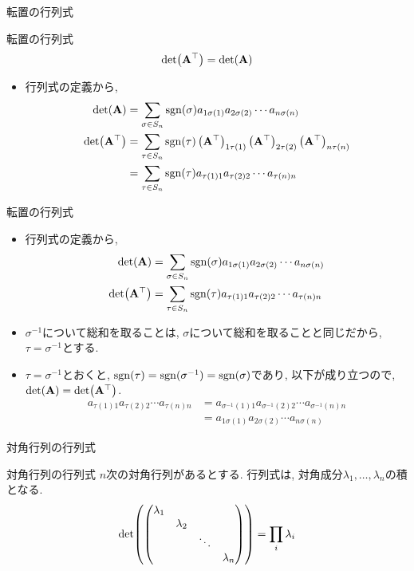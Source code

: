 \documentclass[dvipdfmx,notheorems,t]{beamer}
\begin{document}
\begin{frame}{転置の行列式}
\begin{block}{転置の行列式}
  $$\det(\vb{A}^\top) = \det(\vb{A})$$
\end{block}

\begin{itemize}
  \item 行列式の定義から,
  \begin{align*}
    \det(\vb{A}) &= \sum_{\sigma \in S_n} \operatorname{sgn}(\sigma)
      a_{1 \sigma(1)} a_{2 \sigma(2)} \cdots a_{n \sigma(n)} \\
    \det(\vb{A}^\top) &= \sum_{\tau \in S_n} \operatorname{sgn}(\tau)
      \left( \vb{A}^\top \right)_{1 \tau(1)} \left( \vb{A}^\top \right)_{2 \tau(2)}
      \left( \vb{A}^\top \right)_{n \tau(n)} \\
      &= \sum_{\tau \in S_n} \operatorname{sgn}(\tau)
        a_{\tau(1) 1} a_{\tau(2) 2} \cdots a_{\tau(n) n}
  \end{align*}
\end{itemize}
\end{frame}

\begin{frame}{転置の行列式}
\begin{itemize}
  \item 行列式の定義から,
  \begin{align*}
    \det(\vb{A}) &= \sum_{\sigma \in S_n} \operatorname{sgn}(\sigma)
      a_{1 \sigma(1)} a_{2 \sigma(2)} \cdots a_{n \sigma(n)} \\
    \det(\vb{A}^\top) &= \sum_{\tau \in S_n} \operatorname{sgn}(\tau)
      a_{\tau(1) 1} a_{\tau(2) 2} \cdots a_{\tau(n) n}
  \end{align*}
  \item $\sigma^{-1}$について総和を取ることは, $\sigma$について総和を取ることと同じだから, 
  $\tau = \sigma^{-1}$とする.
  \item $\tau = \sigma^{-1}$とおくと, $\operatorname{sgn}(\tau) = \operatorname{sgn}(\sigma^{-1}) = \operatorname{sgn}(\sigma)$であり,
  以下が成り立つので, $\det(\vb{A}) = \det(\vb{A}^\top)$.
  \begin{align*}
    a_{\tau(1) 1} a_{\tau(2) 2} \cdots a_{\tau(n) n}
      &= a_{\sigma^{-1}(1) 1} a_{\sigma^{-1}(2) 2} \cdots a_{\sigma^{-1}(n) n} \\
      &= a_{1 \sigma(1)} a_{2 \sigma(2)} \cdots a_{n \sigma(n)}
  \end{align*}
\end{itemize}
\end{frame}

\begin{frame}{対角行列の行列式}
\begin{block}{対角行列の行列式}
  $n$次の対角行列があるとする.
  行列式は, 対角成分$\lambda_1, \ldots, \lambda_n$の積となる.
  $$\det(\mqty(\dmat{\lambda_1, \lambda_2, \ddots, \lambda_n})) = \prod_i \lambda_i$$
\end{block}
\end{frame}
\end{document}
